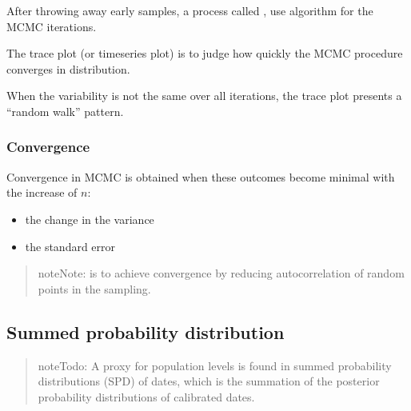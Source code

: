 \documentclass[a4paper,12pt,english]{sphinxhowto}
\begin{document}
After throwing away early samples, a process called , use algorithm for the MCMC iterations.

The trace plot (or time\sphinxhyphen{}series plot) is to judge how quickly the MCMC procedure converges in distribution.

When the variability is not the same over all iterations, the trace plot presents a “random walk” pattern.



\subsubsection{Convergence}
\label{\detokenize{MCMC:convergence}}
Convergence in MCMC is obtained when these outcomes become minimal with the increase of \(n\):
\begin{itemize}
\item {} 
the change in the variance

\item {} 
the standard error

\end{itemize}

\begin{quote}

\begin{sphinxadmonition}{note}{Note:}
 is to achieve convergence by reducing autocorrelation of random points in the sampling.
\end{sphinxadmonition}
\end{quote}



\subsection{Summed probability distribution}
\label{\detokenize{MCMC:summed-probability-distribution}}
\begin{quote}

\begin{sphinxadmonition}{note}{\label{\detokenize{MCMC:id1}}Todo:}
A proxy for population levels is found in summed probability distributions (SPD) of dates,
which is the summation of the posterior probability distributions of calibrated dates.
\end{sphinxadmonition}
\end{quote}
\end{document}
